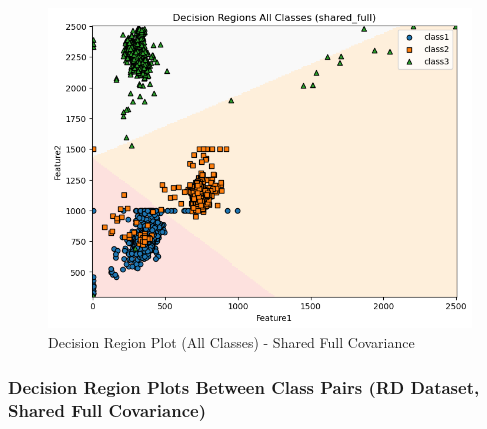 \begin{figure}[H]
    \centering
    \includegraphics[width=0.85\linewidth]{images/RD_Group04_images/02_shared_full/05_decision_region_all.png}
    \caption{Decision Region Plot (All Classes) - Shared Full Covariance}
\end{figure}

\subsubsection{Decision Region Plots Between Class Pairs (RD Dataset, Shared Full Covariance)}

